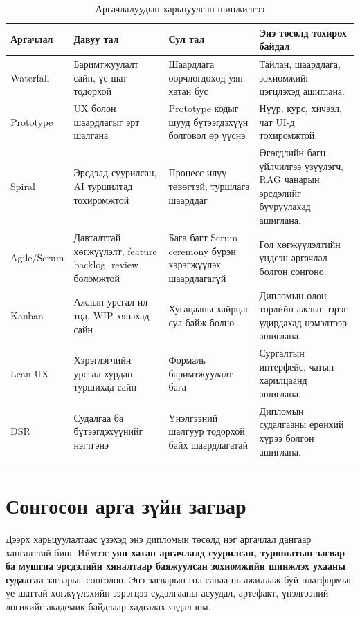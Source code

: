 \begin{longtable}{|p{}|p{}|p{}|p{}|}
  \hline
  \textbf{Аргачлал} & \textbf{Давуу тал} & \textbf{Сул тал} & \textbf{Энэ төсөлд тохирох байдал} \\ \hline
  Waterfall & Баримтжуулалт сайн, үе шат тодорхой & Шаардлага өөрчлөгдөхөд уян хатан бус & Тайлан, шаардлага, зохиомжийг цэгцлэхэд ашиглана. \\ \hline
  Prototype & UX болон шаардлагыг эрт шалгана & Prototype кодыг шууд бүтээгдэхүүн болговол өр үүснэ & Нүүр, курс, хичээл, чат UI-д тохиромжтой. \\ \hline
  Spiral & Эрсдэлд суурилсан, AI туршилтад тохиромжтой & Процесс илүү төвөгтэй, туршлага шаарддаг & Өгөгдлийн багц, үйлчилгээ үзүүлэгч, RAG чанарын эрсдэлийг бууруулахад ашиглана. \\ \hline
  Agile/Scrum & Давталттай хөгжүүлэлт, feature backlog, review боломжтой & Бага багт Scrum ceremony бүрэн хэрэгжүүлэх шаардлагагүй & Гол хөгжүүлэлтийн үндсэн аргачлал болгон сонгоно. \\ \hline
  Kanban & Ажлын урсгал ил тод, WIP хянахад сайн & Хугацааны хайрцаг сул байж болно & Дипломын олон төрлийн ажлыг зэрэг удирдахад нэмэлтээр ашиглана. \\ \hline
  Lean UX & Хэрэглэгчийн урсгал хурдан туршихад сайн & Формаль баримтжуулалт бага & Сургалтын интерфейс, чатын харилцаанд ашиглана. \\ \hline
  DSR & Судалгаа ба бүтээгдэхүүнийг нэгтгэнэ & Үнэлгээний шалгуур тодорхой байх шаардлагатай & Дипломын судалгааны ерөнхий хүрээ болгон ашиглана. \\ \hline
  \caption{Аргачлалуудын харьцуулсан шинжилгээ}
  \label{tab:methodology-comparison}
\end{longtable}

\section{Сонгосон арга зүйн загвар}
Дээрх харьцуулалтаас үзэхэд энэ дипломын төсөлд нэг аргачлал дангаар хангалттай биш. Иймээс \textbf{уян хатан аргачлалд суурилсан, туршилтын загвар ба мушгиа эрсдэлийн хяналтаар баяжуулсан зохиомжийн шинжлэх ухааны судалгаа} загварыг сонголоо. Энэ загварын гол санаа нь ажиллаж буй платформыг үе шаттай хөгжүүлэхийн зэрэгцээ судалгааны асуудал, артефакт, үнэлгээний логикийг академик байдлаар хадгалах явдал юм.

